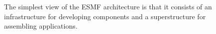 \begin{figure}
\begin{center}
\caption[{ESMF Architecture}] {The simplest view of the ESMF architecture
is that it consists of an infrastructure for developing components and 
a superstructure for assembling applications.}
\label{fig:sandwich}
\end{center}
\end{figure}







